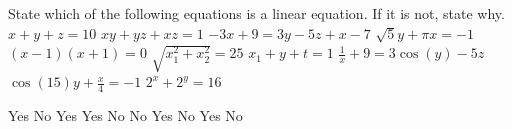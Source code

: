 

\begin{Exercise}[
name={},
title={}, 
difficulty=0,
origin={\cite{GH}}]
State which of the following equations is a linear equation. If it is not, state why.
\Question $x+y+z = 10$
\Question $xy + yz+ xz = 1$
\Question $-3x + 9 = 3y - 5z+ x-7$
\Question $\sqrt{5}y + \pi x =-1$
\Question $(x-1)(x+1) = 0$
\Question $\sqrt{x_1^2+x_2^2} = 25$
\Question $x_1 + y + t = 1$
\Question $\frac{1}{x} + 9 = 3\cos(y) - 5z$
\Question $\cos(15)y + \frac{x}{4} =-1$
\Question $2^x + 2^y = 16$
\end{Exercise}

\begin{Answer}
\Question Yes
\Question No
\Question Yes
\Question Yes
\Question No
\Question No
\Question Yes
\Question No
\Question Yes
\Question No
\end{Answer}
